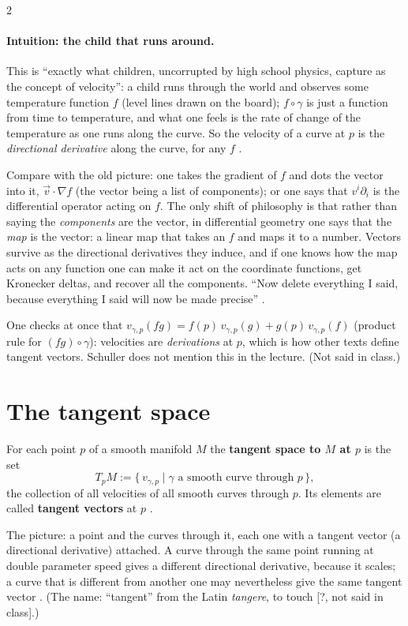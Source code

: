 \begin{paracol}{2}
\paragraph{Intuition: the child that runs around.} This is ``exactly what children, uncorrupted by high school physics, capture as the concept of velocity'': a child runs through the world and observes some temperature function $f$ (level lines drawn on the board); $f\circ\gamma$ is just a function from time to temperature, and
what one feels is the rate of change of the temperature as one runs along the curve. So the velocity of a curve at $p$ is the \emph{directional derivative} along the curve, for any $f$ .

Compare with the old picture: one takes the gradient of $f$ and dots the vector into it, $\vec v\cdot\nabla f$ (the vector being a list of components); or one says that $v^i\partial_i$ is the differential operator acting on $f$. The only shift of philosophy is that rather than saying the \emph{components} are the vector, in differential geometry one says that
the \emph{map} is the vector: a linear map that takes an $f$ and maps it to a number. Vectors survive as the directional derivatives they induce, and if one knows how the map acts on any function one can make it act on the coordinate functions, get Kronecker deltas, and recover all the components. ``Now delete everything I said, because everything I said will now be made precise''
.
\begin{coursenote}[Derivations]
One checks at once that $v_{\gamma,p}(fg)=f(p)\,v_{\gamma,p}(g)+g(p)\,v_{\gamma,p}(f)$ (product rule for $(fg)\circ\gamma$): velocities are \emph{derivations} at $p$, which is how other texts define tangent vectors. Schuller does not mention this in the lecture. (Not said in class.)
\end{coursenote}

\section{The tangent space}\label{sec:c05-tangent}

\begin{definition}\label{def:c05-tangent}
For each point $p$ of a smooth manifold $M$ the \textbf{tangent space to $M$ at $p$} is the set
\[
  T_pM:=\{\,v_{\gamma,p}\mid\gamma\text{ a smooth curve through }p\,\},
\]
the collection of all velocities of all smooth curves through $p$. Its elements are called \textbf{tangent vectors} at $p$
.
\end{definition}
The picture: a point and the curves through it, each one with a tangent vector (a directional derivative) attached. A curve through the same point running at double parameter speed gives a different directional derivative, because it scales; a curve that is different from another one may nevertheless give the same tangent vector .
(The name: ``tangent'' from the Latin \emph{tangere}, to touch [?, not said in class].)


\end{paracol}
